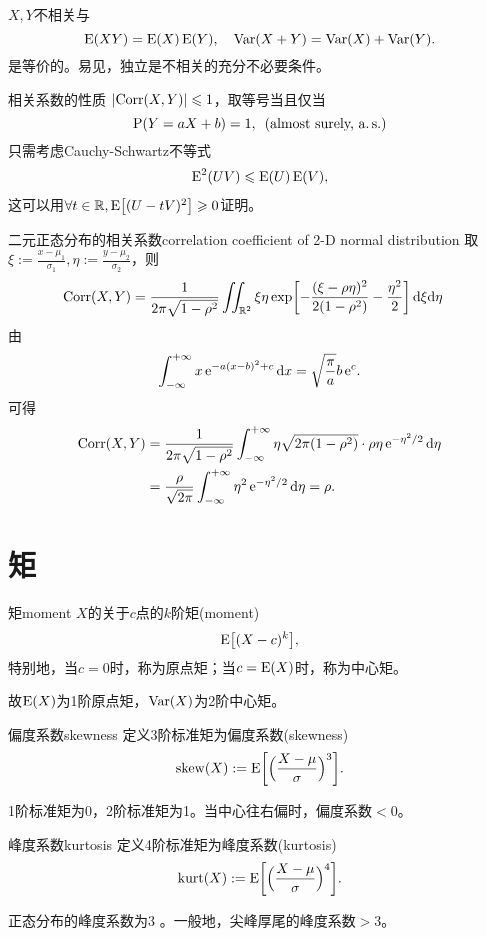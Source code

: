 $X,Y$不相关与
\[
	\E(XY)=\E(X)\E(Y),\quad\Var(X+Y)=\Var(X)+\Var(Y).
\]
是等价的。易见，独立是不相关的充分不必要条件。
\begin{theorem}{相关系数的性质}{}
	$\abs{\Corr(X,Y)}\leqslant 1$，取等号当且仅当
	\[
		\P(Y=aX+b)=1,\enspace(\text{almost~surely,~a.}\,\text{s.})
	\]
	只需考虑Cauchy-Schwartz不等式
	\begin{align}
		\E^2(UV)\leqslant\E(U)\E(V),
	\end{align}
	这可以用$\forall t\in\RR,\E\bigfkh{(U-tV)^2}\geqslant 0$证明。
\end{theorem}
\begin{example}{二元正态分布的相关系数}{correlation coefficient of 2-D normal distribution}
	取$\xi:=\frac{x-\mu_1}{\sigma_1},\eta:=\frac{y-\mu_2}{\sigma_2}$，则
	\begin{align*}
		\Corr(X,Y)%
		&=\frac1{2\pi\sqrt{1-\rho^2}}\iint_{\RR^2}\xi\eta\exp\biggfkh{-\frac{(\xi-\rho\eta)^2}{2(1-\rho^2)}-\frac{\eta^2}2}\d\xi\nd\eta
	\end{align*}
	由
	\[
		\int\iti x\e{-a(x-b)^2+c}\d x=\sqrt{\frac\pi{a}}b\e c.
	\]
	可得
	\begin{align*}
		\Corr(X,Y)&=\frac1{2\pi\sqrt{1-\rho^2}}\int\iti\eta\sqrt{2\pi(1-\rho^2)}\cdot\rho\eta\e{-\eta^2/2}\d\eta\\
		&=\frac\rho{\sqrt{2\pi}}\int\iti\eta^2\e{-\eta^2/2}\d\eta=\rho.
	\end{align*}
\end{example}
\section{矩}
\begin{definition}{矩}{moment}
	$X$的关于$c$点的$k$阶矩(moment)
	\begin{align}
		\E\bigfkh{(X-c)^k},
	\end{align}
	特别地，当$c=0$时，称为原点矩；当$c=\E(X)$时，称为中心矩。
\end{definition}
故$\E(X)$为1阶原点矩，$\Var(X)$为2阶中心矩。
\begin{definition}{偏度系数}{skewness}
	定义3阶标准矩为偏度系数(skewness)
	\begin{align}
		\mathrm{skew}(X):=\E\biggfkh{\Bigkh{\frac{X-\mu}\sigma}^3}.
	\end{align}
\end{definition}
1阶标准矩为0，2阶标准矩为1。当中心往右偏时，偏度系数$<0$。
\begin{definition}{峰度系数}{kurtosis}
	定义4阶标准矩为峰度系数(kurtosis)
	\begin{align}
		\mathrm{kurt}(X):=\E\biggfkh{\Bigkh{\frac{X-\mu}\sigma}^4}.
	\end{align}
\end{definition}
正态分布的峰度系数为3%
。一般地，尖峰厚尾的峰度系数$>3$。
